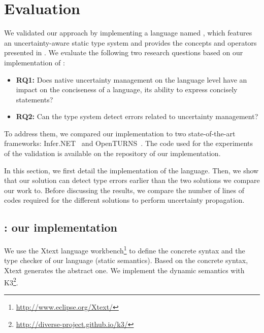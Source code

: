 \section{Evaluation}
\label{sec:aintea:validation}

We validated our approach by implementing a language named \langName{}, which features an uncertainty-aware static type system and provides the concepts and operators presented in .
We evaluate the following two research questions based on our implementation of \langName{}:
\begin{itemize}
	\vspace{-0.5em}
	\setlength\itemsep{-0.3em}
	\item \textbf{RQ1:} Does native uncertainty management on the language level have an impact on the conciseness of a language, \ie its ability to express concisely statements? 
	\item \textbf{RQ2:} Can the type system detect errors related to uncertainty management?
\end{itemize}

To address them, we compared our implementation to two state-of-the-art frameworks: Infer.NET~\cite{url:InferNET18} and OpenTURNS~\cite{baudin2017openturns}.
The code used for the experiments of the validation is available on the repository of our implementation.

In this section, we first detail the implementation of the \langName{} language.
Then, we show that our solution can detect type errors earlier than the two solutions we compare our work to.
Before discussing the results, we compare the number of lines of codes required for the different solutions to perform uncertainty propagation.

\subsection[Ain'tea: our implementation]{\langName{}: our implementation}

We use the Xtext language workbench\footnote{\url{http://www.eclipse.org/Xtext/}} to define the concrete syntax and the type checker of our language (static semantics).
Based on the concrete syntax, Xtext generates the abstract one.
We implement the dynamic semantics with K3\footnote{\url{http://diverse-project.github.io/k3/}}. 

